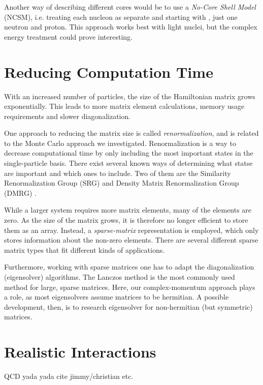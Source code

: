 \documentclass[../main/report.tex]{subfiles}
\begin{document}
Another way of describing different cores would be to use a \emph{No-Core Shell Model} (NCSM), i.e. treating each nucleon as separate and starting with , just one neutron and proton. This approach works best with light nuclei, but the complex energy treatment could prove interesting.

\section{Reducing Computation Time}

With an increased number of particles, the size of the Hamiltonian matrix grows exponentially. This leads to more matrix element calculations, memory usage requirements and slower diagonalization.

One approach to reducing the matrix size is called \emph{renormalization}, and is related to the Monte Carlo approach we investigated. 
Renormalization is a way to decrease computational time by only including the most important states in the single-particle basis.
There exist several known ways of determining what statse are important and which ones to include. Two of them are the Similarity Renormalization Group (SRG) and Density Matrix Renormalization Group (DMRG) \cite{DMRG}. 

While a larger system requires more matrix elements, many of the elements are zero. 
As the size of the matrix grows, it is therefore no longer efficient to store them as an array. 
Instead, a \emph{sparse-matrix} representation is employed, which only stores information about the non-zero elements. 
There are several different sparse matrix types that fit different kinds of applications. 

Furthermore, working with sparse matrices one has to adapt the diagonalization (eigensolver) algorithms. 
The Lanczos method is the most commonly used method for large, sparse matrices.
Here, our complex-momentum approach plays a role, as most eigensolvers assume matrices to be hermitian.
A possible development, then, is to research eigensolver for non-hermitian (but symmetric) matrices.

\section{Realistic Interactions}

QCD yada yada cite jimmy/christian etc.
\end{document}
